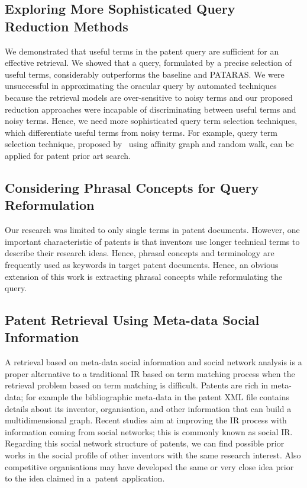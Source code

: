 \subsection{Exploring More Sophisticated Query Reduction Methods}
\label{subsec:SophisticatedQueryReduction}
We demonstrated that useful terms in the patent query are sufficient for an effective retrieval.
We showed that a query, formulated by a precise selection of useful terms, considerably outperforms the baseline and PATARAS. We were unsuccessful in approximating the oracular query by automated techniques 
because the retrieval models are over-sensitive to noisy terms and our proposed reduction approaches were incapable of discriminating between useful terms and noisy terms. 
Hence, we need more sophisticated query term selection techniques, which differentiate useful terms from noisy terms. 
For example, query term selection technique, proposed by~\cite{maxwell2013compact} using affinity graph and random walk, can be applied for patent prior art search.     

\subsection{Considering Phrasal Concepts for Query Reformulation }
\label{subsec: PhraseAnalysis}
Our research was limited to only single terms in patent documents. 
However, one important characteristic of patents is that 
inventors use longer technical terms to describe their research ideas. 
Hence, phrasal concepts and terminology 
are frequently used as keywords in target patent documents.
Hence, an obvious extension of this work is extracting phrasal concepts while reformulating the query. 

\subsection{Patent Retrieval Using Meta-data Social Information}
\label{subsec: Meta-dataNetworkAnalysis}
A retrieval based on meta-data social information and social network analysis 
is a proper alternative to a traditional IR based on term matching process 
when the retrieval problem based on term matching is difficult.
Patents are rich in meta-data; for example 
the bibliographic meta-data in the patent XML file contains details about 
its inventor, organisation, and other information that can build a multidimensional graph.
Recent studies aim at improving the IR process with
information coming from social networks; this is commonly known as social IR. 
Regarding this social network structure of patents, we can  
find possible prior works in the social profile of other inventors with the same research interest.
Also competitive organisations may have developed the same or very close idea prior to the  
idea claimed in a~patent~application.


